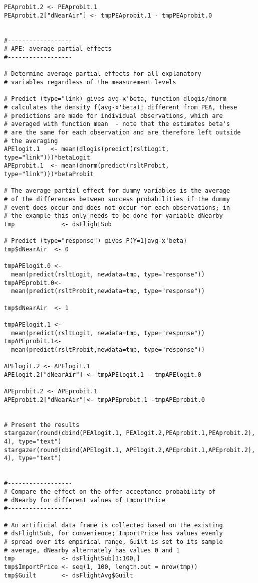 \documentclass{article}
\begin{document}
\begin{tiny}
\begin{verbatim}
PEAprobit.2 <- PEAprobit.1
PEAprobit.2["dNearAir"] <- tmpPEAprobit.1 - tmpPEAprobit.0


#------------------
# APE: average partial effects
#------------------

# Determine average partial effects for all explanatory 
# variables regardless of the measurement levels

# Predict (type="link) gives avg-x'beta, function dlogis/dnorm
# calculates the density f(avg-x'beta); different from PEA, these
# predictions are made for individual observations, which are
# averaged with function mean  - note that the estimates beta's
# are the same for each observation and are therefore left outside
# the averaging
APElogit.1   <- mean(dlogis(predict(rsltLogit, type="link")))*betaLogit
APEprobit.1  <- mean(dnorm(predict(rsltProbit, type="link")))*betaProbit

# The average partial effect for dummy variables is the average
# of the differences between success probabilities if the dummy 
# event does occur and does not occur for each observations; in 
# the example this only needs to be done for variable dNearby
tmp             <- dsFlightSub

# Predict (type="response") gives P(Y=1|avg-x'beta)
tmp$dNearAir  <- 0

tmpAPElogit.0 <- 
  mean(predict(rsltLogit, newdata=tmp, type="response"))
tmpAPEprobit.0<- 
  mean(predict(rsltProbit,newdata=tmp, type="response"))

tmp$dNearAir  <- 1

tmpAPElogit.1 <- 
  mean(predict(rsltLogit, newdata=tmp, type="response"))
tmpAPEprobit.1<- 
  mean(predict(rsltProbit,newdata=tmp, type="response"))

APElogit.2 <- APElogit.1
APElogit.2["dNearAir"] <- tmpAPElogit.1 - tmpAPElogit.0

APEprobit.2 <- APEprobit.1
APEprobit.2["dNearAir"]<- tmpAPEprobit.1 -tmpAPEprobit.0


# Present the results
stargazer(round(cbind(PEAlogit.1, PEAlogit.2,PEAprobit.1,PEAprobit.2), 4), type="text")
stargazer(round(cbind(APElogit.1, APElogit.2,APEprobit.1,APEprobit.2), 4), type="text")


#------------------
# Compare the effect on the offer acceptance probability of 
# dNearby for different values of ImportPrice
#------------------

# An artificial data frame is collected based on the existing
# dsFlightSub, for convenience; ImportPrice has values evenly
# spread over its empirical range, Guilt is set to its sample
# average, dNearby alternately has values 0 and 1
tmp             <- dsFlightSub[1:100,]
tmp$ImportPrice <- seq(1, 100, length.out = nrow(tmp))
tmp$Guilt       <- dsFlightAvg$Guilt


\end{verbatim}
\end{tiny}
\end{document}

